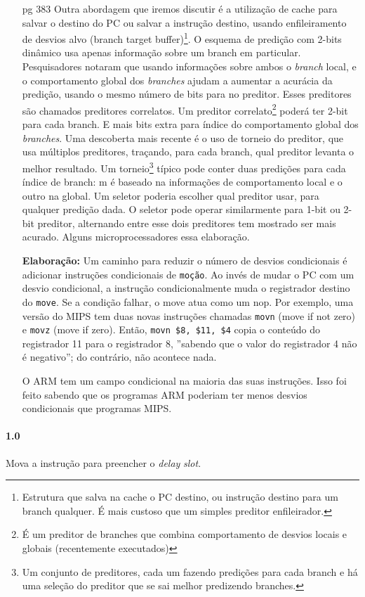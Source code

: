 \documentclass{article}
\begin{document}
\begin{enumerate}
\item[pg 383] Outra abordagem que iremos discutir é a utilização de cache para
salvar o destino do PC ou salvar a instrução destino, usando enfileiramento de
desvios alvo (branch target buffer)\footnote{Estrutura que salva na cache o PC
destino, ou instrução destino para um branch qualquer. É mais custoso que um
simples preditor enfileirador.}. O esquema de predição com 2-bits dinâmico usa
apenas informação sobre um branch em particular. Pesquisadores notaram que
usando informações sobre ambos o \textit{branch} local, e o comportamento global
dos \textit{branches} ajudam a aumentar a acurácia da predição, usando o mesmo
número de bits para no preditor. Esses preditores são chamados preditores
correlatos. Um preditor correlato\footnote{É um preditor de branches que combina
comportamento de desvios locais e globais (recentemente executados)} poderá ter
2-bit para cada branch. E mais bits extra para índice do comportamento global
dos \textit{branches}. Uma descoberta mais recente é o uso de torneio do
preditor, que usa múltiplos preditores, traçando, para cada branch, qual
preditor levanta o melhor resultado. Um torneio\footnote{Um conjunto de
preditores, cada um fazendo predições para cada branch e há uma seleção do
preditor que se sai melhor predizendo branches.} típico pode conter duas
predições para cada índice de branch: m é baseado na informações de
comportamento local e o outro na global. Um seletor poderia escolher qual
preditor usar, para qualquer predição dada. O seletor pode operar similarmente
para 1-bit ou 2-bit preditor, alternando entre esse dois preditores tem mostrado
ser mais acurado. Alguns microprocessadores essa elaboração.

\textbf{Elaboração:} Um caminho para reduzir o número de desvios condicionais é 
adicionar instruções condicionais de \verb|moção|. Ao invés de mudar o PC com 
um desvio condicional, a instrução condicionalmente muda o registrador destino 
do \verb|move|. Se a condição falhar, o move atua como um nop. Por exemplo, uma 
versão do MIPS tem duas novas instruções chamadas \verb|movn| (move if not 
zero) e \verb|movz| (move if zero). Então, \verb|movn $8, $11, $4| copia o 
conteúdo do registrador 11 para o registrador 8, ''sabendo que o valor do 
registrador 4 não é negativo''; do contrário, não acontece nada.

O ARM tem um campo condicional na maioria das suas instruções. Isso foi feito 
sabendo que os programas ARM poderiam ter menos desvios condicionais que 
programas MIPS.

\end{enumerate}

\paragraph{1.0} Mova a instrução para preencher o \textit{delay} \textit{slot}.
\end{document}
